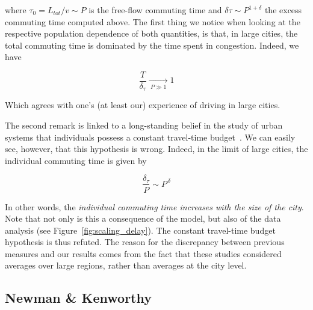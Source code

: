 where $\tau_0 = L_{tot} / v \sim P$ is the free-flow commuting time and $\delta
\tau \sim P^{1+\delta}$ the excess commuting time computed above. The first
thing we notice when looking at the respective population dependence of both
quantities, is that, in large cities, the total commuting time is dominated by
the time spent in congestion. Indeed, we have

\begin{equation}
    \displaystyle \frac{T}{\delta_\tau} \xrightarrow[\:P \gg 1\:]{} 1
\end{equation}

Which agrees with one's (at least our) experience of driving in large cities.

The second remark is linked to a long-standing belief in the study of urban
systems that individuals possess a constant travel-time
budget~\cite{Zahavi:1974}. We can easily see, however, that this hypothesis is
wrong. Indeed, in the limit of large cities, the individual commuting time is
given by

\begin{equation}
    \frac{\delta_\tau}{P} \sim P^{\,\delta}
\end{equation}

In other words, the \emph{individual commuting time increases with the size of the
city}. Note that not only is this a consequence of the model, but also of the
data analysis (see Figure~\ref{fig:scaling_delay}). The constant travel-time
budget hypothesis is thus refuted. The reason for the discrepancy between
previous measures and our results comes from the fact that these studies
considered averages over large regions, rather than averages at the city
level.

\subsection{Newman \& Kenworthy}

